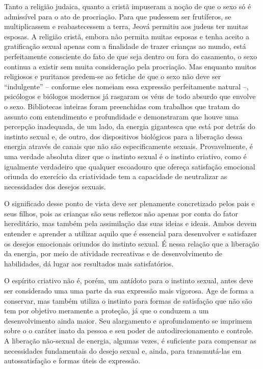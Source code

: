 Tanto a religião judaica, quanto a cristã impuseram a noção de que o
sexo só é admissível para o ato de procriação. Para que pudessem ser
frutíferos, se multiplicassem e reabastecessem a terra, Jeová permitiu
aos judeus ter muitas esposas. A religião cristã, embora não permita
muitas esposas e tenha aceito a gratificação sexual apenas com a
finalidade de trazer crianças ao mundo, está perfeitamente consciente do
fato de que seja dentro ou fora do casamento, o sexo continua a existir
sem muita consideração pela procriação. Mas enquanto muitos religiosos e
puritanos predem-se ao fetiche de que o sexo não deve ser ``indulgente''
-- conforme eles nomeiam essa expressão perfeitamente natural --,
psicólogos e biólogos modernos já rasgaram os véus de todo absurdo que
envolve o sexo. Bibliotecas inteiras foram preenchidas com trabalhos que
tratam do assunto com entendimento e profundidade e demonstraram que
houve uma percepção inadequada, de um lado, da energia gigantesca que
está por detrás do instinto sexual e, de outro, dos dispositivos
biológicos para a liberação dessa energia através de canais que não são
especificamente sexuais. Provavelmente, é uma verdade absoluta dizer que
o instinto sexual é o instinto criativo, como é igualmente verdadeiro
que qualquer escoadouro que ofereça satisfação emocional oriunda do
exercício da criatividade tem a capacidade de neutralizar as
necessidades dos desejos sexuais.

O significado desse ponto de vista deve ser plenamente concretizado
pelos pais e seus filhos, pois as crianças são seus reflexos não apenas
por conta do fator hereditário, mas também pela assimilação das suas
ideias e ideais. Ambos devem entender e aprender a utilizar aquilo que é
essencial para desenvolver e satisfazer os desejos emocionais oriundos
do instinto sexual. É nessa relação que a liberação da energia, por meio
de atividade recreativas e de desenvolvimento de habilidades, dá lugar
aos resultados mais satisfatórios.

O espírito criativo não é, porém, um antídoto para o instinto sexual,
antes deve ser considerado uma uma parte da sua expressão mais vigorosa.
Age de forma a conservar, mas também utiliza o instinto para formas de
satisfação que não são tem por objetivo meramente a proteção, já que o
conduzem a um desenvolvimento ainda maior. Seu alargamento e
aprofundamento se imprimem sobre o o caráter inato da pessoa e seu poder
de autodirecionamento e controle. A liberação não-sexual de energia,
algumas vezes, é suficiente para compensar as necessidades fundamentais
do desejo sexual e, ainda, para transmutá-las em autossatisfação e
formas úteis de expressão.

